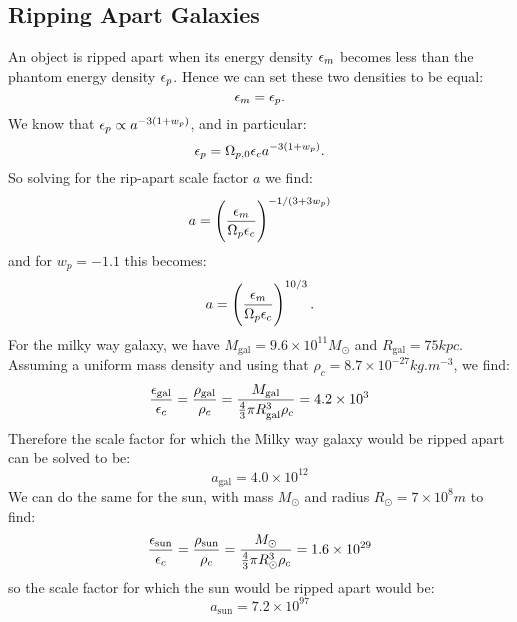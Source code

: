 \subsection{Ripping Apart Galaxies}
An object is ripped apart when its energy density $\epsilon_m$ becomes less than the phantom energy density $\epsilon_p$. Hence we can set these two densities to be equal:
\begin{equation}
    \epsilon_m = \epsilon_p.
\end{equation}
We know that $\epsilon_p \propto a^{-3(1+w_p)}$, and in particular:
\begin{equation}
   \epsilon_p = \Omega_{p, 0}\epsilon_c a^{-3(1+w_p)}.
\end{equation}
So solving for the rip-apart scale factor $a$ we find:
\begin{equation}
    a = \left(\frac{\epsilon_m}{\Omega_p \epsilon_c}\right)^{-1/(3+3w_p)}
\end{equation}
and for $w_p = -1.1$ this becomes:
\begin{equation}
    a = \left(\frac{\epsilon_m}{\Omega_p \epsilon_c}\right)^{10/3}.
\end{equation}
For the milky way galaxy, we have $M_{\text{gal}} = 9.6 \times 10^{11}M_\odot$ and $R_{\text{gal}} = 75\si{kpc}$. Assuming a uniform mass density and using that $\rho_c = 8.7 \times 10^{-27}\si{kg.m^{-3}}$, we find:
\begin{equation}
    \frac{\epsilon_\text{gal}}{\epsilon_c} = \frac{\rho_{\text{gal}}}{\rho_c} = \frac{M_{\text{gal}}}{\frac{4}{3}\pi R_{\text{gal}}^3 \rho_c} = 4.2 \times 10^{3}
\end{equation}
Therefore the scale factor for which the Milky way galaxy would be ripped apart can be solved to be:
\begin{equation}
    \boxed{a_{\text{gal}} = 4.0 \times 10^{12}}
\end{equation} 
We can do the same for the sun, with mass $M_\odot$ and radius $R_\odot = 7 \times 10^8 \si{m}$ to find:
\begin{equation}
    \frac{\epsilon_{\text{sun}}}{\epsilon_c} = \frac{\rho_{\text{sun}}}{\rho_c} = \frac{M_\odot}{\frac{4}{3}\pi R_\odot^3 \rho_c} = 1.6 \times 10^{29}
\end{equation}
so the scale factor for which the sun would be ripped apart would be:
\begin{equation}
    \boxed{a_{\text{sun}} = 7.2 \times 10^{97}}
\end{equation}

